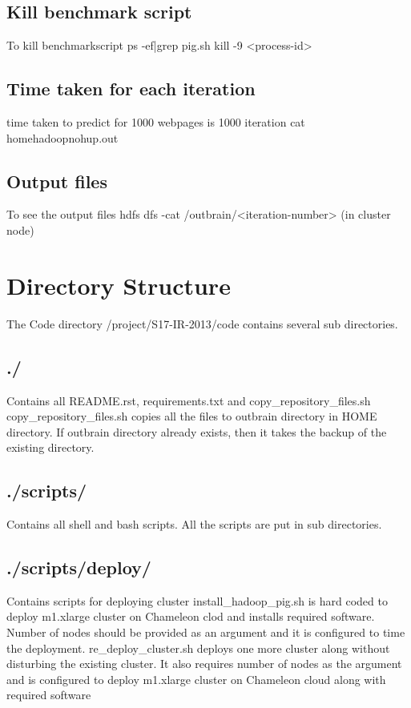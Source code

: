 \documentclass[9pt,twocolumn,twoside]{../../styles/osajnl}
\begin{document}
\subsection{Kill benchmark script} To kill benchmarkscript
\newline ps -ef|grep pig.sh
\newline kill -9 <process-id> 
\subsection{Time taken for each iteration} time taken to predict for 1000 webpages is 1000 iteration
\newline cat \/home\/hadoop\/nohup.out
\subsection{Output files} To see the output files
\newline hdfs dfs -cat /outbrain/<iteration-number> (in cluster node)

\section{Directory Structure}
The Code directory /project/S17-IR-2013/code contains several sub directories. 
\subsection{./} Contains all README.rst, requirements.txt and copy\_repository\_files.sh
\newline copy\_repository\_files.sh copies all the files to outbrain directory in HOME directory. If outbrain directory already exists, then it takes the backup of the existing directory.
\subsection{./scripts/} Contains all shell and bash scripts. All the scripts are put in sub directories.
\subsection{./scripts/deploy/} Contains scripts for deploying cluster
\newline install\_hadoop\_pig.sh is hard coded to deploy m1.xlarge cluster on Chameleon clod and installs required software. Number of nodes should be provided as an argument and it is configured to time the deployment.
\newline re\_deploy\_cluster.sh deploys one more cluster along without disturbing the existing cluster. It also requires number of nodes as the argument and is configured to deploy m1.xlarge cluster on Chameleon cloud along with required software
\end{document}
